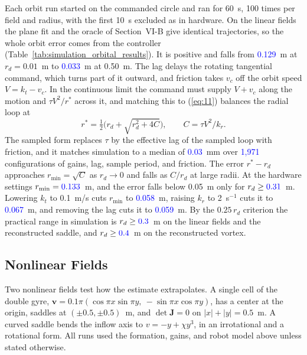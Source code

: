 \documentclass[lettersize,journal]{IEEEtran}
\newcommand{\rev}[1]{\textcolor{blue}{#1}}           %
\begin{document}
Each orbit run started on the commanded circle and ran for 60~s, 100 times per field and radius, with the first 10~s excluded as in hardware. On the linear fields the plane fit and the oracle of Section~VI-B give identical trajectories, so the whole orbit error comes from the controller (Table~\ref{tab:simulation_orbital_results}). It is positive and falls from \rev{0.129}~m at $r_d = 0.01$~m to \rev{0.033}~m at 0.50~m. The lag delays the rotating tangential command, which turns part of it outward, and friction takes $v_c$ off the orbit speed $V = k_t - v_c$. In the continuous limit the command must supply $V + v_c$ along the motion and $\tau V^2/r^*$ across it, and matching this to (\ref{eq:11}) balances the radial loop at
\begin{equation}\label{eq:orbit_cf}
r^* = \tfrac{1}{2}\bigl(r_d + \sqrt{r_d^2 + 4C}\bigr), \qquad C = \tau V^2/k_r.
\end{equation}
The sampled form replaces $\tau$ by the effective lag of the sampled loop with friction, and it matches simulation to a median of \rev{0.03}~mm over \rev{1,971} configurations of gains, lag, sample period, and friction. The error $r^* - r_d$ approaches $r_{\min} = \sqrt{C}$ as $r_d \to 0$ and falls as $C/r_d$ at large radii. At the hardware settings $r_{\min} = \rev{0.133}$~m, and the error falls below 0.05~m only for $r_d \ge \rev{0.31}$~m. Lowering $k_t$ to 0.1~m/s cuts $r_{\min}$ to \rev{0.058}~m, raising $k_r$ to 2~s$^{-1}$ cuts it to \rev{0.067}~m, and removing the lag cuts it to \rev{0.059}~m. By the $0.25\,r_d$ criterion the practical range in simulation is $r_d \ge \rev{0.3}$~m on the linear fields and the reconstructed saddle, and $r_d \ge \rev{0.4}$~m on the reconstructed vortex. %

\subsection{Nonlinear Fields}

Two nonlinear fields test how the estimate extrapolates. A single cell of the double gyre, $\mathbf{v} = 0.1\pi(\cos\pi x \sin\pi y,\ -\sin\pi x \cos\pi y)$, has a center at the origin, saddles at $(\pm 0.5, \pm 0.5)$~m, and $\det\mathbf{J} = 0$ on $|x| + |y| = 0.5$~m. A curved saddle bends the inflow axis to $v = -y + \chi y^3$, in an irrotational and a rotational form. All runs used the formation, gains, and robot model above unless stated otherwise.
\end{document}
